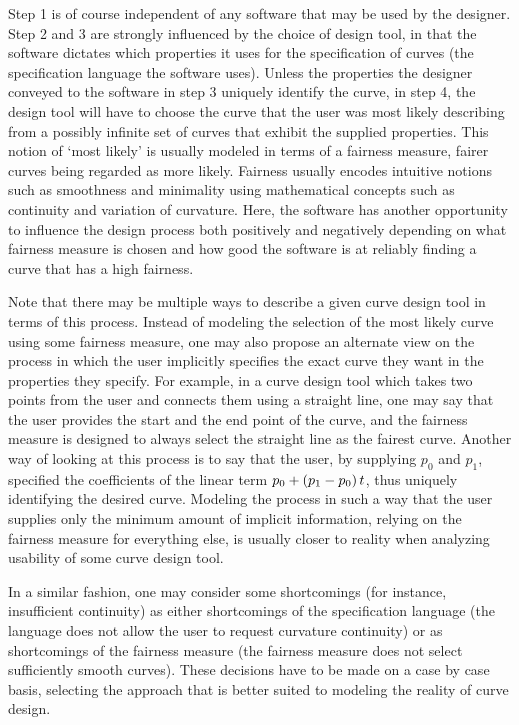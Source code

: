 \documentclass[a4paper]{article}
\begin{document}
			Step 1 is of course independent of any software that may be used by the designer. Step 2 and 3 are strongly influenced by the choice of design tool, in that the software dictates which properties it uses for the specification of curves (the specification language the software uses). Unless the properties the designer conveyed to the software in step 3 uniquely identify the curve, in step 4, the design tool will have to choose the curve that the user was most likely describing from a possibly infinite set of curves that exhibit the supplied properties. This notion of `most likely' is usually modeled in terms of a fairness measure, fairer curves being regarded as more likely. Fairness usually encodes intuitive notions such as smoothness and minimality using mathematical concepts such as continuity and variation of curvature. Here, the software has another opportunity to influence the design process both positively and negatively depending on what fairness measure is chosen and how good the software is at reliably finding a curve that has a high fairness.

			Note that there may be multiple ways to describe a given curve design tool in terms of this process. Instead of modeling the selection of the most likely curve using some fairness measure, one may also propose an alternate view on the process in which the user implicitly specifies the exact curve they want in the properties they specify. For example, in a curve design tool which takes two points from the user and connects them using a straight line, one may say that the user provides the start and the end point of the curve, and the fairness measure is designed to always select the straight line as the fairest curve. Another way of looking at this process is to say that the user, by supplying \(p_0\) and \(p_1\), specified the coefficients of the linear term \(p_0 + \left( p_1 - p_0 \right) t\), thus uniquely identifying the desired curve. Modeling the process in such a way that the user supplies only the minimum amount of implicit information, relying on the fairness measure for everything else, is usually closer to reality when analyzing usability of some curve design tool.

			In a similar fashion, one may consider some shortcomings (for instance, insufficient continuity) as either shortcomings of the specification language (the language does not allow the user to request curvature continuity) or as shortcomings of the fairness measure (the fairness measure does not select sufficiently smooth curves). These decisions have to be made on a case by case basis, selecting the approach that is better suited to modeling the reality of curve design.
\end{document}
